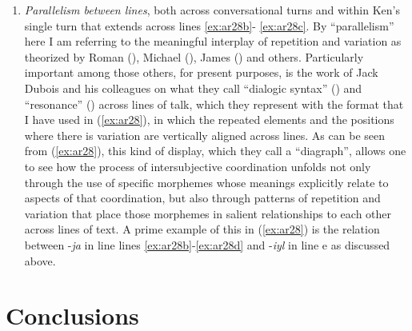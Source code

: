 \documentclass[output=paper]{langsci/langscibook}
\begin{document}
\begin{enumerate}
	\item \emph{Parallelism between lines}, both across conversational turns and within Ken’s single turn that extends across lines  \ref{ex:ar28b}- \ref{ex:ar28c}. By “parallelism” here I am referring to the meaningful interplay of repetition and variation as theorized by Roman \citeauthor{Jakobson1960} (\citeyear{Jakobson1960}), Michael \citeauthor{Silverstein2004} (\citeyear{Silverstein2004}), James \citeauthor{Fox2014} (\citeyear{Fox2014}) and others. Particularly important among those others, for present purposes, is the work of Jack Dubois and his colleagues on what they call “dialogic syntax” (\citealt{DuBois2014}) and “resonance” (\citealt{DuBoisGloria2014}) across lines of talk, which they represent with the format that I have used in (\ref{ex:ar28}), in which the repeated elements and the positions where there is variation are vertically aligned across lines. As can be seen from (\ref{ex:ar28}), this kind of display, which they call a “diagraph”, allows one to see how the process of intersubjective coordination unfolds not only through the use of specific morphemes whose meanings explicitly relate to aspects of that coordination, but also through patterns of repetition and variation that place those morphemes in salient relationships to each other across lines of text. A prime example of this in (\ref{ex:ar28}) is the relation between -\textit{ja} in line lines \ref{ex:ar28b}-\ref{ex:ar28d} and -\textit{iyl} in line e as discussed above.
\end{enumerate}


\section{Conclusions}\label{s:ar8}
\end{document}
